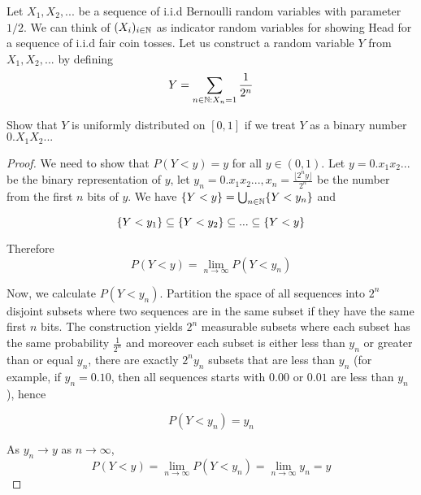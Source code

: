\documentclass{article}
\begin{document}
Let $X_1, X_2, ...$ be a sequence of i.i.d Bernoulli random variables with parameter $1/2$. We can think of $(X_i)_{i \in \mathbb{N}}$ as indicator random variables for showing Head for a sequence of i.i.d fair coin tosses. Let us construct a random variable $Y$ from $X_1, X_2, ...$ by defining
$$
    Y = \sum_{n \in \mathbb{N}: X_n = 1} \frac{1}{2^n}
$$

Show that $Y$ is uniformly distributed on $[0, 1]$ if we treat $Y$ as a binary number $0. X_1 X_2 ...$

\begin{proof}

We need to show that $P(Y < y) = y$ for all $y \in (0, 1)$. Let $y = 0. x_1 x_2 ...$ be the binary representation of $y$, let $y_n = 0. x_1 x_2 ..., x_n = \frac{\lfloor 2^n y \rfloor}{2^n}$ be the number from the first $n$ bits of $y$. We have $\{Y < y\} = \bigcup_{n \in \mathbb{N}} \{Y < y_n\}$ and

$$
    \{Y < y_1\} \subseteq \{Y < y_2\} \subseteq ... \subseteq \{Y < y\}
$$

Therefore
$$
    P(Y < y) = \lim_{n \to \infty} P(Y < y_n)
$$

Now, we calculate $P(Y < y_n)$. Partition the space of all sequences into $2^n$ disjoint subsets where two sequences are in the same subset if they have the same first $n$ bits. The construction yields $2^n$ measurable subsets where each subset has the same probability $\frac{1}{2^n}$ and moreover each subset is either less than $y_n$ or greater than or equal $y_n$, there are exactly $2^n y_n$ subsets that are less than $y_n$ (for example, if $y_n = 0.10$, then all sequences starts with $0.00$ or $0.01$ are less than $y_n$), hence
 
$$
    P(Y < y_n) = y_n
$$

As $y_n \to y$ as $n \to \infty$,
$$
    P(Y < y) = \lim_{n \to \infty} P(Y < y_n) = \lim_{n \to \infty} y_n = y
$$



    
\end{proof}
\end{document}
